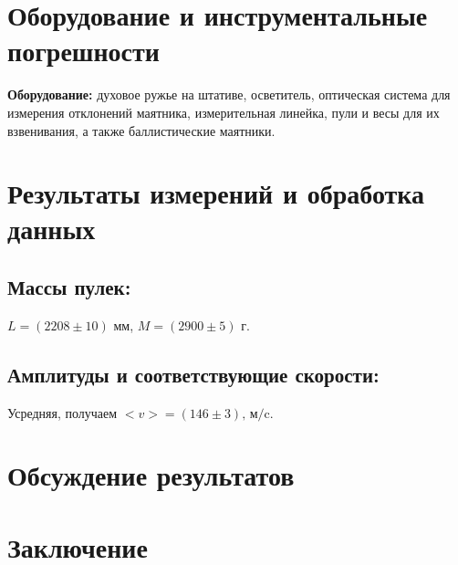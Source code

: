 \documentclass[a4paper, 12pt]{article}
\begin{document}
	\section{Оборудование и инструментальные погрешности}
	\textbf{Оборудование:} духовое ружье на штативе, осветитель, оптическая система для измерения отклонений маятника, измерительная линейка, пули и весы для их взвенивания, а также баллистические маятники.
	
	
	
	\section{Результаты измерений и обработка данных}
	\subsection{Массы пулек:}
	
	$L = (2208\pm10)$ мм, $M=(2900\pm5)$ г.
	
	\subsection{Амплитуды и соответствующие скорости:}
	
	Усредняя, получаем $<v>=(146\pm3)\text{, м/c}$.
	\section{Обсуждение результатов}
	
	\section{Заключение}
	
\end{document}
